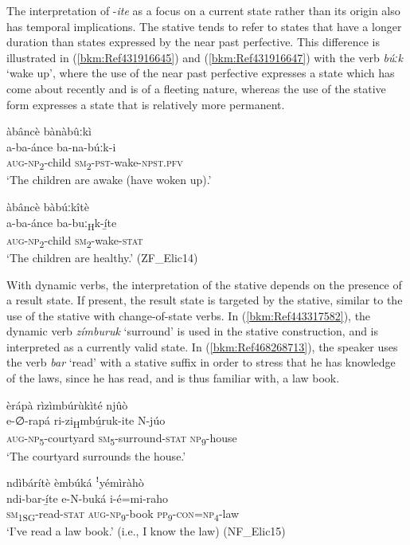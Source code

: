 The interpretation of -\textit{ite} as a focus on a current state rather than its origin also has temporal implications. The stative tends to refer to states that have a longer duration than states expressed by the near past perfective. This difference is illustrated in (\ref{bkm:Ref431916645}) and (\ref{bkm:Ref431916647}) with the verb \textit{búːk} ‘wake up’, where the use of the near past perfective expresses a state which has come about recently and is of a fleeting nature, whereas the use of the stative form expresses a state that is relatively more permanent.

\ea
\label{bkm:Ref431916645}
àbâncè bànàbûːkì\\
\gll a-ba-ánce    ba-na-búːk-i\\
\textsc{aug}-\textsc{np}\textsubscript{2}-child  \textsc{sm}\textsubscript{2}-\textsc{pst}-wake-\textsc{npst}.\textsc{pfv}\\
\glt ‘The children are awake (have woken up).’
\z

\ea
\label{bkm:Ref431916647}
àbâncè bàbúːkîtè\\
\gll a-ba-ánce     ba-buː\textsubscript{H}k-í̲te\\
\textsc{aug}-\textsc{np}\textsubscript{2}-child  \textsc{sm}\textsubscript{2}-wake-\textsc{stat}\\
\glt ‘The children are healthy.’ (ZF\_Elic14)
\z

With dynamic verbs, the interpretation of the stative depends on the presence of a result state. If present, the result state is targeted by the stative, similar to the use of the stative with change-of-state verbs. In (\ref{bkm:Ref443317582}), the dynamic verb \textit{zímburuk} ‘surround’ is used in the stative construction, and is interpreted as a currently valid state. In (\ref{bkm:Ref468268713}), the speaker uses the verb \textit{bar} ‘read’ with a stative suffix in order to stress that he has knowledge of the laws, since he has read, and is thus familiar with, a law book.

\ea
\label{bkm:Ref443317582}
èrápà rìzìmbúrùkìté njûò\\
\gll e-∅-rapá    ri-zi\textsubscript{H}mbú̲ruk-ite  N-júo\\
\textsc{aug}-\textsc{np}\textsubscript{5}-courtyard  \textsc{sm}\textsubscript{5}-surround-\textsc{stat}\textsubscript{} \textsc{np}\textsubscript{9}-house\\
\glt ‘The courtyard surrounds the house.’
\z

\ea
\label{bkm:Ref468268713}
ndìbárítè èmbúká ꜝyémìràhò\\
\gll ndi-bar-í̲te    e-N-buká    i-é=mi-raho\\
\textsc{sm}\textsubscript{1SG}-read-\textsc{stat}  \textsc{aug}-\textsc{np}\textsubscript{9}-book  \textsc{pp}\textsubscript{9}-\textsc{con}=\textsc{np}\textsubscript{4}-law\\
\glt ‘I’ve read a law book.’ (i.e., I know the law) (NF\_Elic15)
\z

